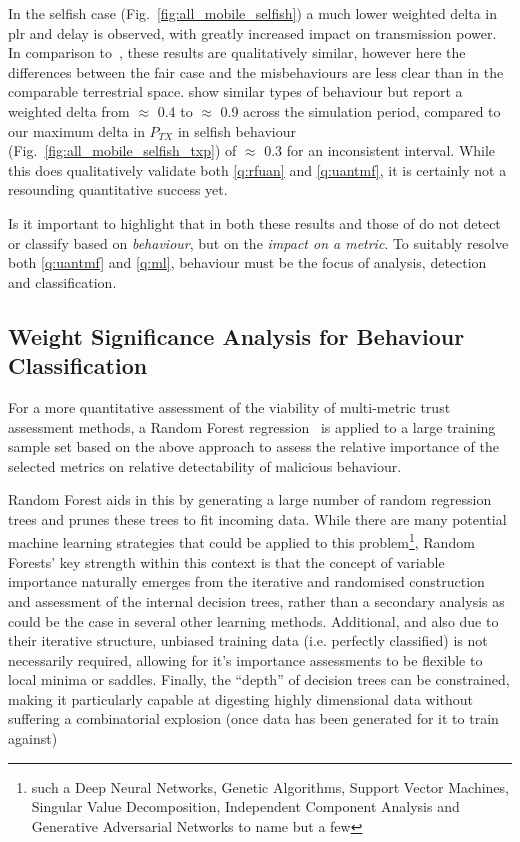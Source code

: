 In the selfish case (Fig.~\ref{fig:all_mobile_selfish}) a much lower weighted delta in \gls{plr} and delay is observed, with greatly increased impact on transmission power.
In comparison to~\cite{Guo11}, these results are qualitatively similar, however here the differences between the fair case and the misbehaviours are less clear than in the comparable terrestrial space.
\citet{Guo11} show similar types of behaviour but report a weighted delta from $\approx$ 0.4 to $\approx$ 0.9 across the simulation period, compared to our maximum delta in $P_{TX}$ in selfish behaviour (Fig.~\ref{fig:all_mobile_selfish_txp}) of $\approx$ 0.3 for an inconsistent interval.
While this does qualitatively validate both \autoref{q:rfuan} and \autoref{q:uantmf}, it is certainly not a resounding quantitative success yet.

Is it important to highlight that in both these results and those of \citet{Guo11} do not detect or classify based on \emph{behaviour}, but on the \emph{impact on a metric}.
To suitably resolve both \autoref{q:uantmf} and \autoref{q:ml}, behaviour must be the focus of analysis, detection and classification.

\subsection{Weight Significance Analysis for Behaviour Classification}\label{sec:metric_significance}

For a more quantitative assessment of the viability of multi-metric trust assessment methods, a Random Forest regression~\cite{Breiman2001} is applied to a large training sample set based on the above approach to assess the relative importance of the selected metrics on relative detectability of malicious behaviour.

Random Forest aids in this by generating a large number of random regression trees and prunes these trees to fit incoming data.
While there are many potential machine learning strategies that could be applied to this problem\footnote{such a Deep Neural Networks, Genetic Algorithms, Support Vector Machines, Singular Value Decomposition, Independent Component Analysis and Generative Adversarial Networks to name but a few}, Random Forests' key strength within this context is that the concept of variable importance naturally emerges from the iterative and randomised construction and assessment of the internal decision trees, rather than a secondary analysis as could be the case in several other learning methods\cite{Altmann2010, Ho2002}. Additional, and also due to their iterative structure, unbiased training data (i.e. perfectly classified) is not necessarily required, allowing for it's importance assessments to be flexible to local minima or saddles. Finally, the ``depth'' of decision trees can be constrained, making it particularly capable at digesting highly dimensional data without suffering a combinatorial explosion (once data has been generated for it to train against)


